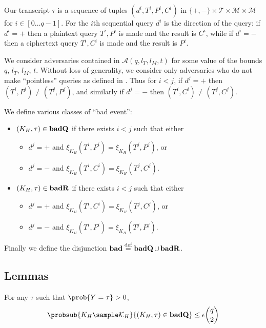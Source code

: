\documentclass[eprint.tex]{subfiles}
\begin{document}
Our transcript $\tau$ is a sequence of tuples
$(d^i, T^i, P^i, C^i)$
in
$\{+, -\} \times \mathcal{T} \times \mathcal{M} \times \mathcal{M}$
for $i \in [0 \ldots q-1]$.
For the $i$th sequential query
$d^i$ is the direction of the query:
if $d^i = +$ then a plaintext query $T^i, P^i$ is made and the result is $C^i$,
while if $d^i = -$ then a ciphertext query $T^i, C^i$ is made and the result is $P^i$.

We consider adversaries contained in $\mathcal{A}(q, l_T, l_M, t)$ for some value of
the bounds $q$, $l_T$, $l_M$, $t$.
Without loss of generality, we consider only adversaries who do not make ``pointless''
queries as defined in \cite{cmc}. Thus for $i < j$, if $d^j = +$ then
$(T^i, P^i) \neq (T^j, P^j)$, and similarly if $d^j = -$ then
$(T^i, C^i) \neq (T^j, C^j)$.

We define various classes of ``bad event'':

\begin{itemize}
    \item $(K_H, \tau) \in \operatorname{\mathbf{badQ}}$ if there exists $i < j$ such that either
    \begin{itemize}
        \item $d^j = +$ and $\xi_{K_H}(T^i, P^i) = \xi_{K_H}(T^j, P^j)$, or
        \item $d^j = -$ and $\xi_{K_H}(T^i, C^i) = \xi_{K_H}(T^j, C^j)$.
    \end{itemize}
    \item $(K_H, \tau) \in \operatorname{\mathbf{badR}}$ if there exists $i < j$ such that either
    \begin{itemize}
        \item $d^j = +$ and $\xi_{K_H}(T^i, C^i) = \xi_{K_H}(T^j, C^j)$, or
        \item $d^j = -$ and $\xi_{K_H}(T^i, P^i) = \xi_{K_H}(T^j, P^j)$.
    \end{itemize}
\end{itemize}

Finally we define the disjunction
$\operatorname{\mathbf{bad}} \stackrel{\text{def}}{=} \operatorname{\mathbf{badQ}} \cup \operatorname{\mathbf{badR}}$.

\subsection{Lemmas}
\begin{lemma} \label{badQ}
    For any $\tau$ such that $\prob{Y = \tau} > 0$,
    \begin{displaymath}
        \probsub{K_H \sample \mathcal{K}_H}{(K_H, \tau) \in \badQ}
        \leq \epsilon \binom{q}{2}
    \end{displaymath}
\end{lemma}
\end{document}
